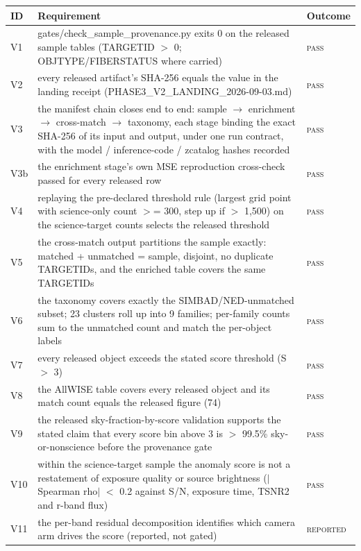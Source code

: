 \begin{ruledtabular}
\begin{tabular}{l p{} l}
ID & Requirement & Outcome \\
\hline
V1 & gates/check\_sample\_provenance.py exits 0 on the released sample tables (TARGETID $>$ 0; OBJTYPE/FIBERSTATUS where carried) & \textsc{pass} \\
V2 & every released artifact's SHA-256 equals the value in the landing receipt (PHASE3\_V2\_LANDING\_2026-09-03.md) & \textsc{pass} \\
V3 & the manifest chain closes end to end: sample $\to$ enrichment $\to$ cross-match $\to$ taxonomy, each stage binding the exact SHA-256 of its input and output, under one run contract, with the model / inference-code / zcatalog hashes recorded & \textsc{pass} \\
V3b & the enrichment stage's own MSE reproduction cross-check passed for every released row & \textsc{pass} \\
V4 & replaying the pre-declared threshold rule (largest grid point with science-only count $>$= 300, step up if $>$ 1,500) on the science-target counts selects the released threshold & \textsc{pass} \\
V5 & the cross-match output partitions the sample exactly: matched + unmatched = sample, disjoint, no duplicate TARGETIDs, and the enriched table covers the same TARGETIDs & \textsc{pass} \\
V6 & the taxonomy covers exactly the SIMBAD/NED-unmatched subset; 23 clusters roll up into 9 families; per-family counts sum to the unmatched count and match the per-object labels & \textsc{pass} \\
V7 & every released object exceeds the stated score threshold (S $>$ 3) & \textsc{pass} \\
V8 & the AllWISE table covers every released object and its match count equals the released figure (74) & \textsc{pass} \\
V9 & the released sky-fraction-by-score validation supports the stated claim that every score bin above 3 is $>$ 99.5\% sky-or-nonscience before the provenance gate & \textsc{pass} \\
V10 & within the science-target sample the anomaly score is not a restatement of exposure quality or source brightness ($|$Spearman rho$|$ $<$ 0.2 against S/N, exposure time, TSNR2 and r-band flux) & \textsc{pass} \\
V11 & the per-band residual decomposition identifies which camera arm drives the score (reported, not gated) & \textsc{reported} \\

\end{tabular}
\end{ruledtabular}
